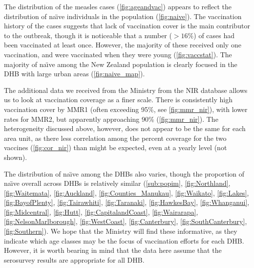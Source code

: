 \documentclass{article}
\begin{document}
The distribution of the measles cases (\autoref{fig:ageandvac}) appears to reflect the distribution of na\"{\i}ve individuals in the population (\autoref{fig:naive}). The vaccination history of the cases suggests that lack of vaccination cover is the main contributor to the outbreak, though it is noticeable that a number ($>16\%$) of cases had been vaccinated at least once. However, the majority of these received only one vaccination, and were vaccinated when they were young (\autoref{fig:vaccstat}). The majority of na\"{\i}ve among the New Zealand population is clearly focused in the DHB with large urban areas (\autoref{fig:naive_map}). 

The additional data we received from the Ministry from the NIR database allows us to look at vaccination coverage as a finer scale. There is consistently high vaccination cover by MMR1 (often exceeding 95\%, see \autoref{fig:mmr_nir}), with lower rates for MMR2, but apparently approaching 90\% (\autoref{fig:mmr_nir}). The heterogeneity discussed above, however, does not appear to be the same for each area unit, as there less correlation among the percent coverage for the two vaccines (\autoref{fig:cor_nir}) than might be expected, even at a yearly level (not shown).

The distribution of na\"{\i}ve among the DHBs also varies, though the proportion of na\"{\i}ve overall across DHBs is relatively similar (\autoref{sub:popim}, \autoref{fig:Northland}, \autoref{fig:Waitemata}, \autoref{fig:Auckland}, \autoref{fig:Counties_Manukau}, \autoref{fig:Waikato}, \autoref{fig:Lakes}, \autoref{fig:BayofPlenty}, \autoref{fig:Tairawhiti}, \autoref{fig:Taranaki}, \autoref{fig:HawkesBay}, \autoref{fig:Whanganui}, \autoref{fig:Midcentral}, \autoref{fig:Hutt}, \autoref{fig:CapitalandCoast}, \autoref{fig:Wairarapa}, \autoref{fig:NelsonMarlborough}, \autoref{fig:WestCoast}, \autoref{fig:Canterbury}, \autoref{fig:SouthCanterbury}, \autoref{fig:Southern}).  We hope that the Ministry will find these informative, as they indicate which age classes may be the focus of vaccination efforts for each DHB. However, it is worth bearing in mind that the data here assume that the serosurvey results are appropriate for all DHB.
\end{document}
